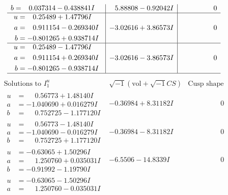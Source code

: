 \documentclass[1p]{elsarticle_modified}
\theoremstyle{definition}
\newcommand{\I}{\sqrt{-1}}
\begin{document}
$$\begin{array}{c|c|c}
\begin{aligned}
b &= \phantom{-}0.037314 - 0.438841 I\end{aligned}
 & \phantom{-}5.88808 - 0.92042 I & \phantom{-0.000000 } 0 \\ \hline\begin{aligned}
u &= \phantom{-}0.25489 + 1.47796 I \\
a &= \phantom{-}0.911154 - 0.269340 I \\
b &= -0.801265 + 0.938714 I\end{aligned}
 & -3.02616 + 3.86573 I & \phantom{-0.000000 } 0 \\ \hline\begin{aligned}
u &= \phantom{-}0.25489 - 1.47796 I \\
a &= \phantom{-}0.911154 + 0.269340 I \\
b &= -0.801265 - 0.938714 I\end{aligned}
 & -3.02616 - 3.86573 I & \phantom{-0.000000 } 0\\
 \hline 
 \end{array}$$\newpage$$\begin{array}{c|c|c}  
\text{Solutions to }I^u_{1}& \I (\text{vol} + \sqrt{-1}CS) & \text{Cusp shape}\\
 \hline 
\begin{aligned}
u &= \phantom{-}0.56773 + 1.48140 I \\
a &= -1.040690 + 0.016279 I \\
b &= \phantom{-}0.752725 - 1.177120 I\end{aligned}
 & -0.36984 + 8.31182 I & \phantom{-0.000000 } 0 \\ \hline\begin{aligned}
u &= \phantom{-}0.56773 - 1.48140 I \\
a &= -1.040690 - 0.016279 I \\
b &= \phantom{-}0.752725 + 1.177120 I\end{aligned}
 & -0.36984 - 8.31182 I & \phantom{-0.000000 } 0 \\ \hline\begin{aligned}
u &= -0.63065 + 1.50296 I \\
a &= \phantom{-}1.250760 + 0.035031 I \\
b &= -0.91992 - 1.19790 I\end{aligned}
 & -6.5506 - 14.8339 I & \phantom{-0.000000 } 0 \\ \hline\begin{aligned}
u &= -0.63065 - 1.50296 I \\
a &= \phantom{-}1.250760 - 0.035031 I \\

\end{aligned}
\end{array}$$
\end{document}
